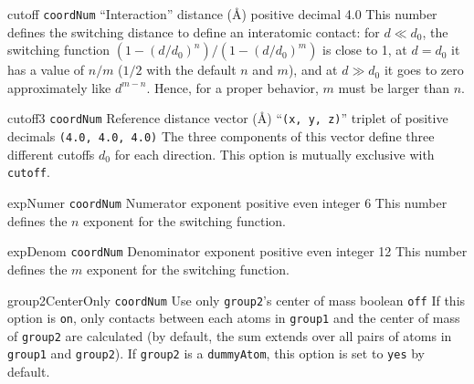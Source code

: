 \begin{cvcoptions}

\item %

\item %

\item %
  \keydef
    {cutoff}{%
    \texttt{coordNum}}{%
    ``Interaction'' distance (\AA)}{%
    positive decimal}{%
    4.0}{%
    This number defines the switching distance to define an
    interatomic contact: for $d \ll d_0$, the switching function
    $(1-(d/d_0)^{n})/(1-(d/d_0)^{m})$ is close to 1, at $d = d_0$ it
    has a value of $n/m$ ($1/2$ with the default $n$ and $m$), and at
    $d \gg d_0$ it goes to zero approximately like $d^{m-n}$.  Hence,
    for a proper behavior, $m$ must be larger than $n$.}

\item %
  \keydef
    {cutoff3}{%
    \texttt{coordNum}}{%
    Reference distance vector (\AA)}{%
    ``\texttt{(x, y, z)}'' triplet of positive decimals}{%
    \texttt{(4.0, 4.0, 4.0)}}{%
    The three components of this vector define three different cutoffs
    $d_{0}$ for each direction.  This option is mutually exclusive with
    \texttt{cutoff}.}

\item %
  \keydef
    {expNumer}{%
    \texttt{coordNum}}{%
    Numerator exponent}{%
    positive even integer}{%
    6}{%
    This number defines the $n$ exponent for the switching function.}

\item %
  \keydef
    {expDenom}{%
    \texttt{coordNum}}{%
    Denominator exponent}{%
    positive even integer}{%
    12}{%
    This number defines the $m$ exponent for the switching function.}

\item %
  \keydef
    {group2CenterOnly}{%
    \texttt{coordNum}}{%
    Use only \texttt{group2}'s center of
    mass}{%
    boolean}{%
    \texttt{off}}{%
    If this option is \texttt{on}, only contacts between each atoms in \texttt{group1} and the center of mass of     \texttt{group2} are calculated (by default, the sum extends over all pairs of atoms in \texttt{group1} and \texttt{group2}).
If \texttt{group2} is a \texttt{dummyAtom}, this option is set to \texttt{yes} by default.
}


\end{cvcoptions}
